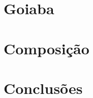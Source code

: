 \documentclass{beamer}
\begin{document}
\frame{
  \frametitle{}
}

\section{Goiaba}

\frame{
  \frametitle{}
}

\section{Composição}

\frame{
  \frametitle{}
}

\section{Conclusões}

\frame{
  \frametitle{}
}

\end{document}

